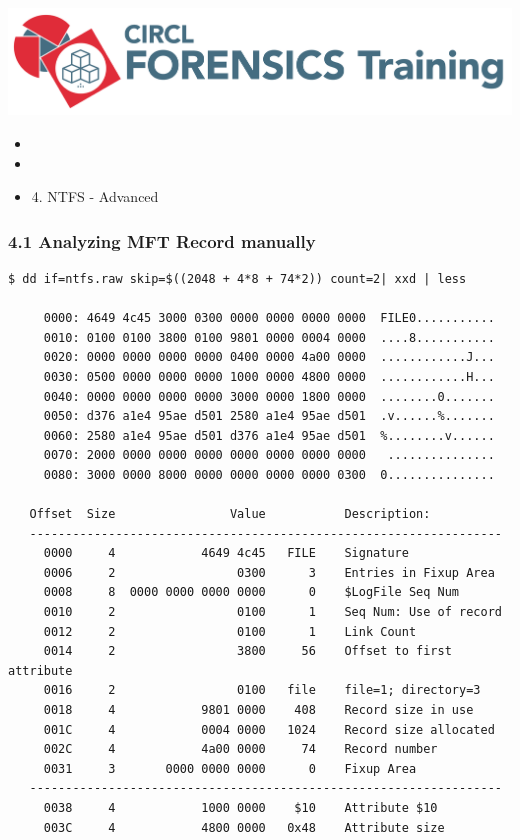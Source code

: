 %
%



\begin{frame}
    \includegraphics[scale=0.3]{images/logo-circl-Forensics.png}
    \begin{itemize}
        \item[]
        \item[]
        \item[] 4. NTFS - Advanced
    \end{itemize}
\end{frame}


\begin{frame}[fragile]
  \frametitle{4.1 Analyzing MFT Record manually}
  \begin{lstlisting}[basicstyle=\tiny]
$ dd if=ntfs.raw skip=$((2048 + 4*8 + 74*2)) count=2| xxd | less

     0000: 4649 4c45 3000 0300 0000 0000 0000 0000  FILE0...........
     0010: 0100 0100 3800 0100 9801 0000 0004 0000  ....8...........
     0020: 0000 0000 0000 0000 0400 0000 4a00 0000  ............J...
     0030: 0500 0000 0000 0000 1000 0000 4800 0000  ............H...
     0040: 0000 0000 0000 0000 3000 0000 1800 0000  ........0.......
     0050: d376 a1e4 95ae d501 2580 a1e4 95ae d501  .v......%.......
     0060: 2580 a1e4 95ae d501 d376 a1e4 95ae d501  %........v......
     0070: 2000 0000 0000 0000 0000 0000 0000 0000   ...............
     0080: 3000 0000 8000 0000 0000 0000 0000 0300  0...............

   Offset  Size                Value           Description:
   ------------------------------------------------------------------
     0000     4            4649 4c45   FILE    Signature
     0006     2                 0300      3    Entries in Fixup Area
     0008     8  0000 0000 0000 0000      0    $LogFile Seq Num
     0010     2                 0100      1    Seq Num: Use of record
     0012     2                 0100      1    Link Count
     0014     2                 3800     56    Offset to first attribute
     0016     2                 0100   file    file=1; directory=3
     0018     4            9801 0000    408    Record size in use
     001C     4            0004 0000   1024    Record size allocated
     002C     4            4a00 0000     74    Record number
     0031     3       0000 0000 0000      0    Fixup Area
   ------------------------------------------------------------------
     0038     4            1000 0000    $10    Attribute $10
     003C     4            4800 0000   0x48    Attribute size
  \end{lstlisting}
\end{frame}


